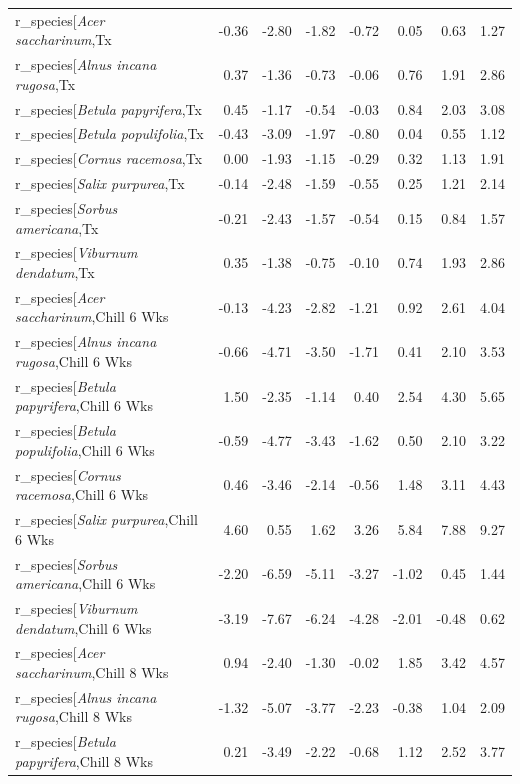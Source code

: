 \documentclass{article}\usepackage[]{graphicx}\usepackage[]{color}
\begin{document}
\begin{longtable}{lrrrrrrr}
  r_species[\textit{Acer saccharinum},Tx & -0.36 & -2.80 & -1.82 & -0.72 & 0.05 & 0.63 & 1.27 \\ 
  r_species[\textit{Alnus incana rugosa},Tx & 0.37 & -1.36 & -0.73 & -0.06 & 0.76 & 1.91 & 2.86 \\ 
  r_species[\textit{Betula papyrifera},Tx & 0.45 & -1.17 & -0.54 & -0.03 & 0.84 & 2.03 & 3.08 \\ 
  r_species[\textit{Betula populifolia},Tx & -0.43 & -3.09 & -1.97 & -0.80 & 0.04 & 0.55 & 1.12 \\ 
  r_species[\textit{Cornus racemosa},Tx & 0.00 & -1.93 & -1.15 & -0.29 & 0.32 & 1.13 & 1.91 \\ 
  r_species[\textit{Salix purpurea},Tx & -0.14 & -2.48 & -1.59 & -0.55 & 0.25 & 1.21 & 2.14 \\ 
  r_species[\textit{Sorbus americana},Tx & -0.21 & -2.43 & -1.57 & -0.54 & 0.15 & 0.84 & 1.57 \\ 
  r_species[\textit{Viburnum dendatum},Tx & 0.35 & -1.38 & -0.75 & -0.10 & 0.74 & 1.93 & 2.86 \\ 
  r_species[\textit{Acer saccharinum},Chill 6 Wks & -0.13 & -4.23 & -2.82 & -1.21 & 0.92 & 2.61 & 4.04 \\ 
  r_species[\textit{Alnus incana rugosa},Chill 6 Wks & -0.66 & -4.71 & -3.50 & -1.71 & 0.41 & 2.10 & 3.53 \\ 
  r_species[\textit{Betula papyrifera},Chill 6 Wks & 1.50 & -2.35 & -1.14 & 0.40 & 2.54 & 4.30 & 5.65 \\ 
  r_species[\textit{Betula populifolia},Chill 6 Wks & -0.59 & -4.77 & -3.43 & -1.62 & 0.50 & 2.10 & 3.22 \\ 
  r_species[\textit{Cornus racemosa},Chill 6 Wks & 0.46 & -3.46 & -2.14 & -0.56 & 1.48 & 3.11 & 4.43 \\ 
  r_species[\textit{Salix purpurea},Chill 6 Wks & 4.60 & 0.55 & 1.62 & 3.26 & 5.84 & 7.88 & 9.27 \\ 
  r_species[\textit{Sorbus americana},Chill 6 Wks & -2.20 & -6.59 & -5.11 & -3.27 & -1.02 & 0.45 & 1.44 \\ 
  r_species[\textit{Viburnum dendatum},Chill 6 Wks & -3.19 & -7.67 & -6.24 & -4.28 & -2.01 & -0.48 & 0.62 \\ 
  r_species[\textit{Acer saccharinum},Chill 8 Wks & 0.94 & -2.40 & -1.30 & -0.02 & 1.85 & 3.42 & 4.57 \\ 
  r_species[\textit{Alnus incana rugosa},Chill 8 Wks & -1.32 & -5.07 & -3.77 & -2.23 & -0.38 & 1.04 & 2.09 \\ 
  r_species[\textit{Betula papyrifera},Chill 8 Wks & 0.21 & -3.49 & -2.22 & -0.68 & 1.12 & 2.52 & 3.77 \\ 

\end{longtable}
\end{document}
